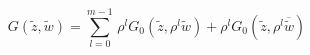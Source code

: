\begin{equation}
G(\tilde{z},\tilde{w})=\sum _{l=0}^{m-1}\, \rho ^{l}G_{0}(\tilde{z},\rho
^{l}\tilde{w})+\rho ^{l}G_{0}(\tilde{z},\rho ^{l}\overline{\tilde{w}})
\end{equation}

